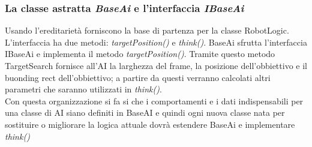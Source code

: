\subsubsection{La classe astratta \emph{BaseAi} e l'interfaccia \emph{IBaseAi}}
Usando l'ereditarietà forniscono la base di partenza per la classe RobotLogic.\\
L'interfaccia ha due metodi: \emph{targetPosition()} e \emph{think()}.
BaseAi sfrutta l'interfaccia IBaseAi e implementa il metodo \emph{targetPosition()}. 
Tramite questo metodo TargetSearch fornisce all'AI la larghezza del frame, la posizione 
dell'obbiettivo e il buonding rect dell'obbiettivo; a partire da questi verranno 
calcolati altri parametri che saranno utilizzati in \emph{think()}.\\
Con questa organizzazione si fa si che i comportamenti e i dati indispensabili per una classe di 
AI siano definiti in BaseAI e quindi ogni nuova classe nata per sostituire o migliorare
 la logica attuale dovrà estendere BaseAi e implementare \emph{think()} 


